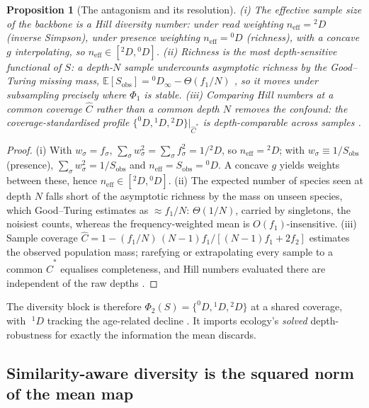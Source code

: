 \documentclass[11pt]{article}
\theoremstyle{oldplain}
\newtheorem{proposition}{Proposition}
\theoremstyle{oldrem}
\newcommand{\E}{\mathds{E}}
\begin{document}
\begin{proposition}[The antagonism and its resolution]\label{prop:antag}
\emph{(i)} The effective sample size of the backbone is a Hill diversity number: under read weighting
$n_{\mathrm{eff}}={}^2D$ (inverse Simpson), under presence weighting $n_{\mathrm{eff}}={}^0D$ (richness), with a
concave $g$ interpolating, so $n_{\mathrm{eff}}\in[{}^2D,{}^0D]$. \emph{(ii)} Richness is the most depth-sensitive
functional of $S$: a depth-$N$ sample undercounts asymptotic richness by the Good--Turing missing mass,
$\E[S_{\mathrm{obs}}]={}^0D_\infty-\Theta(f_1/N)$ \cite{Good1953,Chao1984,Kaplinsky2016}, so it moves under
subsampling precisely where $\Phi_1$ is stable. \emph{(iii)} Comparing Hill numbers at a common \emph{coverage}
$\hat C$ rather than a common depth $N$ removes the confound: the coverage-standardised profile
$\{^0D,{}^1D,{}^2D\}|_{\hat C^\ast}$ is depth-comparable across samples \cite{Hill1973,Jost2006,ChaoJost2012,Hsieh2016}.
\end{proposition}
\begin{proof}
(i) With $w_\sigma=f_\sigma$, $\sum_\sigma w_\sigma^2=\sum_\sigma f_\sigma^2=1/{}^2D$, so $n_{\mathrm{eff}}={}^2D$;
with $w_\sigma\equiv1/S_{\mathrm{obs}}$ (presence), $\sum_\sigma w_\sigma^2=1/S_{\mathrm{obs}}$ and
$n_{\mathrm{eff}}=S_{\mathrm{obs}}={}^0D$. A concave $g$ yields weights between these, hence
$n_{\mathrm{eff}}\in[{}^2D,{}^0D]$. (ii) The expected number of species seen at depth $N$ falls short of the
asymptotic richness by the mass on unseen species, which Good--Turing estimates as $\approx f_1/N$: $\Theta(1/N)$,
carried by singletons, the noisiest counts, whereas the frequency-weighted mean is $O(f_1)$-insensitive. (iii)
Sample coverage $\hat C=1-(f_1/N)\,(N-1)f_1/[(N-1)f_1+2f_2]$ estimates the observed population mass; rarefying or
extrapolating every sample to a common $\hat C^\ast$ equalises completeness, and Hill numbers evaluated there are
independent of the raw depths \cite{ChaoJost2012}. \end{proof}

The diversity block is therefore $\Phi_2(S)=\{^0D,{}^1D,{}^2D\}$ at a shared coverage, with $\;^1D$ tracking the
age-related decline \cite{Britanova2014}. It imports ecology's \emph{solved} depth-robustness for exactly the
information the mean discards.

\subsection{Similarity-aware diversity is the squared norm of the mean map}\label{sec:samp-simdiv}
\end{document}
